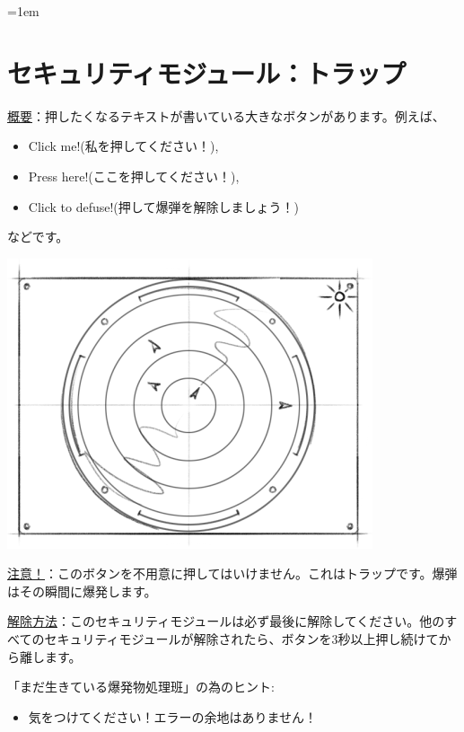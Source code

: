 \begin{minipage}{0.63\textwidth}
    \parskip=1em
    \section*{セキュリティモジュール：トラップ}
    
    \uline{概要}：押したくなるテキストが書いている大きなボタンがあります。例えば{、}

    \begin{itemize}
        \item Click me!(私を押してください！),
        \item Press here!(ここを押してください！),
        \item Click to defuse!(押して爆弾を解除しましょう！)
    \end{itemize}
    
    などです。
\end{minipage}%
\hfill%
\begin{minipage}{0.33\textwidth}
    \includegraphics[width=\textwidth]{images/17.png}
    \vspace*{\fill}
\end{minipage}
    
\uline{注意！}：このボタンを不用意に押してはいけません。これはトラップです。爆弾はその瞬間に爆発します。
    
\uline{解除方法}：このセキュリティモジュールは必ず最後に解除してください。他のすべてのセキュリティモジュールが解除されたら、ボタンを3秒以上押し続けてから離します。

「まだ生きている爆発物処理班」の為のヒント:
\begin{itemize}
    \item 気をつけてください！エラーの余地はありません！
\end{itemize}
